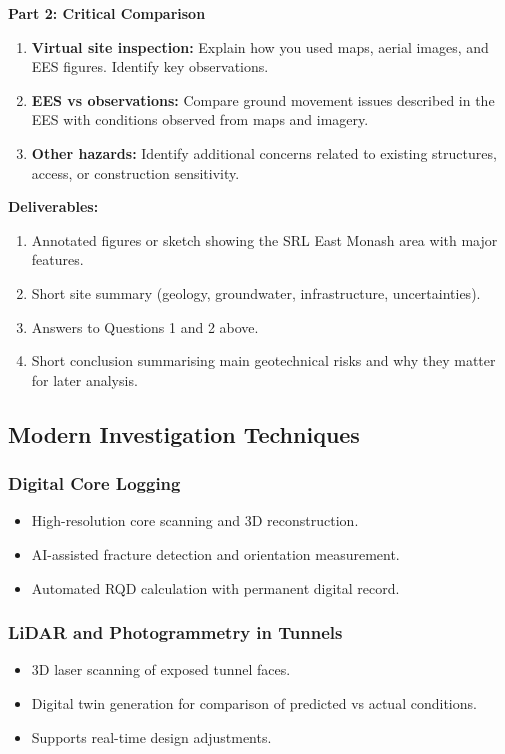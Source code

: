 \documentclass[a4paper,12pt]{article}
\begin{document}
\textbf{Part 2: Critical Comparison}
\begin{enumerate}
    \item[2.1] \textbf{Virtual site inspection:} Explain how you used maps, aerial images, and EES figures. Identify key observations.
    \item[2.2] \textbf{EES vs observations:} Compare ground movement issues described in the EES with conditions observed from maps and imagery.
    \item[2.3] \textbf{Other hazards:} Identify additional concerns related to existing structures, access, or construction sensitivity.
\end{enumerate}

\textbf{Deliverables:}
\begin{enumerate}
    \item Annotated figures or sketch showing the SRL East Monash area with major features.
    \item Short site summary (geology, groundwater, infrastructure, uncertainties).
    \item Answers to Questions 1 and 2 above.
    \item Short conclusion summarising main geotechnical risks and why they matter for later analysis.
\end{enumerate}

\subsection{Modern Investigation Techniques}
\subsubsection{Digital Core Logging}
\begin{itemize}
    \item High-resolution core scanning and 3D reconstruction.
    \item AI-assisted fracture detection and orientation measurement.
    \item Automated RQD calculation with permanent digital record.
\end{itemize}

\subsubsection{LiDAR and Photogrammetry in Tunnels}
\begin{itemize}
    \item 3D laser scanning of exposed tunnel faces.
    \item Digital twin generation for comparison of predicted vs actual conditions.
    \item Supports real-time design adjustments.
\end{itemize}
\end{document}

